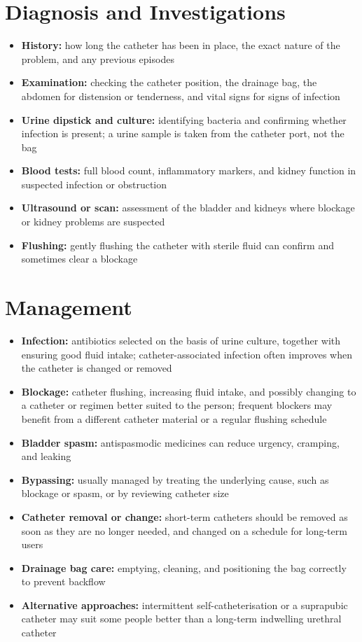 \section*{Diagnosis and Investigations}
\begin{itemize}
    \item \textbf{History:} how long the catheter has been in place, the exact nature of the problem, and any previous episodes
    \item \textbf{Examination:} checking the catheter position, the drainage bag, the abdomen for distension or tenderness, and vital signs for signs of infection
    \item \textbf{Urine dipstick and culture:} identifying bacteria and confirming whether infection is present; a urine sample is taken from the catheter port, not the bag
    \item \textbf{Blood tests:} full blood count, inflammatory markers, and kidney function in suspected infection or obstruction
    \item \textbf{Ultrasound or scan:} assessment of the bladder and kidneys where blockage or kidney problems are suspected
    \item \textbf{Flushing:} gently flushing the catheter with sterile fluid can confirm and sometimes clear a blockage
\end{itemize}

\section*{Management}
\begin{itemize}
    \item \textbf{Infection:} antibiotics selected on the basis of urine culture, together with ensuring good fluid intake; catheter-associated infection often improves when the catheter is changed or removed
    \item \textbf{Blockage:} catheter flushing, increasing fluid intake, and possibly changing to a catheter or regimen better suited to the person; frequent blockers may benefit from a different catheter material or a regular flushing schedule
    \item \textbf{Bladder spasm:} antispasmodic medicines can reduce urgency, cramping, and leaking
    \item \textbf{Bypassing:} usually managed by treating the underlying cause, such as blockage or spasm, or by reviewing catheter size
    \item \textbf{Catheter removal or change:} short-term catheters should be removed as soon as they are no longer needed, and changed on a schedule for long-term users
    \item \textbf{Drainage bag care:} emptying, cleaning, and positioning the bag correctly to prevent backflow
    \item \textbf{Alternative approaches:} intermittent self-catheterisation or a suprapubic catheter may suit some people better than a long-term indwelling urethral catheter
\end{itemize}

